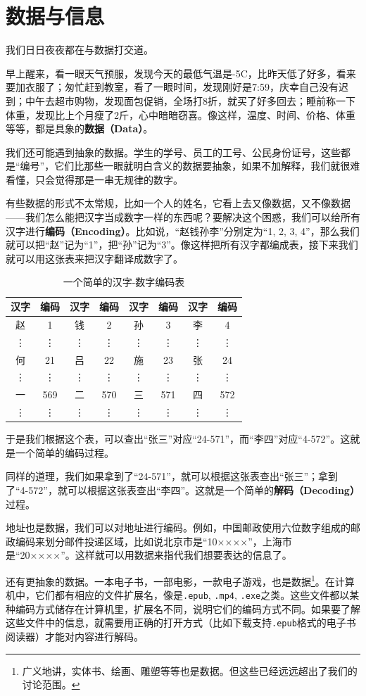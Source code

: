 \section{数据与信息}
我们日日夜夜都在与数据打交道。\par
早上醒来，看一眼天气预服，发现今天的最低气温是-5\textdegree C，比昨天低了好多，看来要加衣服了；匆忙赶到教室，看了一眼时间，发现刚好是7:59，庆幸自己没有迟到；中午去超市购物，发现面包促销，全场打8折，就买了好多回去；睡前称一下体重，发现比上个月瘦了2斤，心中暗暗窃喜。像这样，温度、时间、价格、体重等等，都是具象的\textbf{数据（Data）}。\par
我们还可能遇到抽象的数据。学生的学号、员工的工号、公民身份证号，这些都是“编号”，它们比那些一眼就明白含义的数据要抽象，如果不加解释，我们就很难看懂，只会觉得那是一串无规律的数字。\par
有些数据的形式不太常规，比如一个人的姓名，它看上去又像数据，又不像数据——我们怎么能把汉字当成数字一样的东西呢？要解决这个困惑，我们可以给所有汉字进行\textbf{编码（Encoding）}。比如说，``赵钱孙李''分别定为``1, 2, 3, 4''，那么我们就可以把``赵''记为``1''，把``孙''记为``3''。像这样把所有汉字都编成表，接下来我们就可以用这张表来把汉字翻译成数字了。\par
\begin{longtable}{|c|c|c|c|c|c|c|c|}
\caption{一个简单的汉字-数字编码表}\\
\hline
\textbf{汉字} & \textbf{编码} & \textbf{汉字} & \textbf{编码} & \textbf{汉字} & \textbf{编码} & \textbf{汉字} & \textbf{编码}\\
\hline\hline
赵 & 1 & 钱 & 2 & 孙 & 3 & 李 & 4 \\
\hline
\vdots & \vdots & \vdots & \vdots & \vdots & \vdots & \vdots & \vdots \\
\hline
何 & 21 & 吕 & 22 & 施 & 23 & 张 & 24 \\
\hline
\vdots & \vdots & \vdots & \vdots & \vdots & \vdots & \vdots & \vdots \\
\hline
一 & 569 & 二 & 570 & 三 & 571 & 四 & 572 \\
\hline
\vdots & \vdots & \vdots & \vdots & \vdots & \vdots & \vdots & \vdots \\
\hline
\end{longtable}\par
于是我们根据这个表，可以查出``张三''对应``24-571''，而``李四''对应``4-572''。这就是一个简单的编码过程。\par
同样的道理，我们如果拿到了``24-571''，就可以根据这张表查出``张三''；拿到了``4-572''，就可以根据这张表查出``李四''。这就是一个简单的\textbf{解码（Decoding）}过程。\par
地址也是数据，我们可以对地址进行编码。例如，中国邮政使用六位数字组成的邮政编码来划分邮件投递区域，比如说北京市是``10××××''，上海市是``20××××''。这样就可以用数据来指代我们想要表达的信息了。\par
还有更抽象的数据。一本电子书，一部电影，一款电子游戏，也是数据\footnote{广义地讲，实体书、绘画、雕塑等等也是数据。但这些已经远远超出了我们的讨论范围。}。在计算机中，它们都有相应的文件扩展名，像是\texttt{.epub}, \texttt{.mp4}, \texttt{.exe}之类。这些文件都以某种编码方式储存在计算机里，扩展名不同，说明它们的编码方式不同。如果要了解这些文件中的信息，就需要用正确的打开方式（比如下载支持\texttt{.epub}格式的电子书阅读器）才能对内容进行解码。\par
